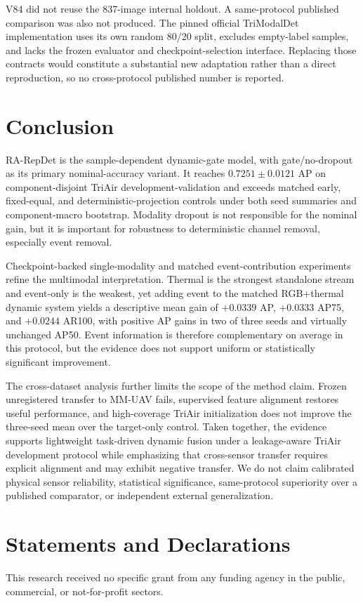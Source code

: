 V84 did not reuse the 837-image internal holdout. A same-protocol published comparison was also not produced. The pinned official TriModalDet implementation uses its own random 80/20 split, excludes empty-label samples, and lacks the frozen evaluator and checkpoint-selection interface. Replacing those contracts would constitute a substantial new adaptation rather than a direct reproduction, so no cross-protocol published number is reported.

\section{Conclusion}
RA-RepDet is the sample-dependent dynamic-gate model, with gate/no-dropout as its primary nominal-accuracy variant. It reaches $0.7251\pm0.0121$ AP on component-disjoint TriAir development-validation and exceeds matched early, fixed-equal, and deterministic-projection controls under both seed summaries and component-macro bootstrap. Modality dropout is not responsible for the nominal gain, but it is important for robustness to deterministic channel removal, especially event removal.

Checkpoint-backed single-modality and matched event-contribution experiments refine the multimodal interpretation. Thermal is the strongest standalone stream and event-only is the weakest, yet adding event to the matched RGB+thermal dynamic system yields a descriptive mean gain of $+0.0339$ AP, $+0.0333$ AP75, and $+0.0244$ AR100, with positive AP gains in two of three seeds and virtually unchanged AP50. Event information is therefore complementary on average in this protocol, but the evidence does not support uniform or statistically significant improvement.

The cross-dataset analysis further limits the scope of the method claim. Frozen unregistered transfer to MM-UAV fails, supervised feature alignment restores useful performance, and high-coverage TriAir initialization does not improve the three-seed mean over the target-only control. Taken together, the evidence supports lightweight task-driven dynamic fusion under a leakage-aware TriAir development protocol while emphasizing that cross-sensor transfer requires explicit alignment and may exhibit negative transfer. We do not claim calibrated physical sensor reliability, statistical significance, same-protocol superiority over a published comparator, or independent external generalization.

\section*{Statements and Declarations}
This research received no specific grant from any funding agency in the public, commercial, or not-for-profit sectors.

